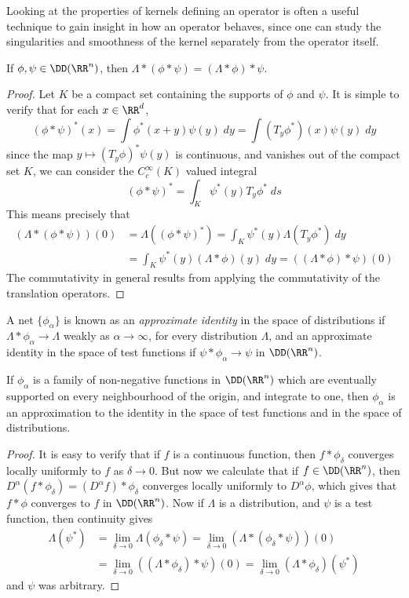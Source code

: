 Looking at the properties of kernels defining an operator is often a useful technique to gain insight in how an operator behaves, since one can study the singularities and smoothness of the kernel separately from the operator itself.

\begin{theorem}
    If $\phi, \psi \in \DD(\RR^n)$, then $\Lambda * (\phi * \psi) = (\Lambda * \phi) * \psi$.
\end{theorem}
\begin{proof}
  Let $K$ be a compact set containing the supports of $\phi$ and $\psi$. It is simple to verify that for each $x \in \RR^d$,
    \[ (\phi * \psi)^*(x) = \int \phi^*(x + y) \psi(y)\; dy = \int (T_y \phi^*)(x) \psi(y)\; dy \]
    since the map $y \mapsto (T_y \phi)^* \psi(y)$ is continuous, and vanishes out of the compact set $K$, we can consider the $C_c^\infty(K)$ valued integral
    \[ (\phi * \psi)^* = \int_K \psi^*(y) T_y \phi^*\; ds \]
    This means precisely that
    \begin{align*}
        (\Lambda * (\phi * \psi))(0) &= \Lambda((\phi * \psi)^*) = \int_K \psi^*(y) \Lambda(T_y \phi^*)\; dy\\
        &= \int_K \psi^*(y) (\Lambda * \phi)(y)\; dy = ((\Lambda * \phi) * \psi)(0)
    \end{align*}
    The commutativity in general results from applying the commutativity of the translation operators.
\end{proof}

A net $\{ \phi_\alpha \}$ is known as an {\it approximate identity} in the space of distributions if $\Lambda * \phi_\alpha \to \Lambda$ weakly as $\alpha \to \infty$, for every distribution $\Lambda$, and an approximate identity in the space of test functions if $\psi * \phi_\alpha \to \psi$ in $\DD(\RR^n)$.

\begin{theorem}
    If $\phi_\alpha$ is a family of non-negative functions in $\DD(\RR^n)$ which are eventually supported on every neighbourhood of the origin, and integrate to one, then $\phi_\alpha$ is an approximation to the identity in the space of test functions and in the space of distributions.
\end{theorem}
\begin{proof}
    It is easy to verify that if $f$ is a continuous function, then $f * \phi_\delta$ converges locally uniformly to $f$ as $\delta \to 0$. But now we calculate that if $f \in \DD(\RR^n)$, then $D^\alpha(f * \phi_\delta) = (D^\alpha f) * \phi_\delta$ converges locally uniformly to $D^\alpha \phi$, which gives that $f * \phi$ converges to $f$ in $\DD(\RR^n)$. Now if $\Lambda$ is a distribution, and $\psi$ is a test function, then continuity gives
    \begin{align*}
        \Lambda(\psi^*) &= \lim_{\delta \to 0} \Lambda(\phi_\delta * \psi) = \lim_{\delta \to 0} (\Lambda * (\phi_\delta * \psi))(0)\\
        &= \lim_{\delta \to 0} ((\Lambda * \phi_\delta) * \psi)(0) = \lim_{\delta \to 0} (\Lambda * \phi_\delta)(\psi^*)
    \end{align*}
    and $\psi$ was arbitrary.
\end{proof}

